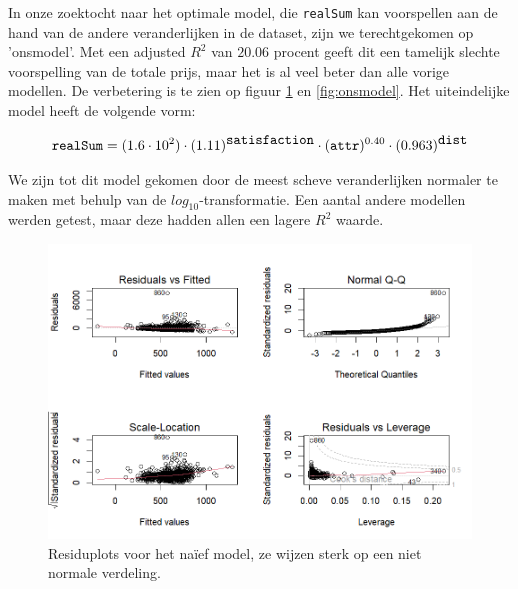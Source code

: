 \documentclass[a4paper]{kulakarticle}
\begin{document}
	In onze zoektocht naar het optimale model, die \verb*|realSum| kan voorspellen aan de hand van de andere veranderlijken in de dataset, zijn we terechtgekomen op 'onsmodel'. Met een adjusted $R^2$ van $20.06$ procent geeft dit een tamelijk slechte voorspelling van de totale prijs, maar het is al veel beter dan alle vorige modellen. De verbetering is te zien op figuur \ref{fig:naiefmodel} en \ref{fig:onsmodel}. Het uiteindelijke model heeft de volgende vorm:
	
	\begin{equation}
		\verb*|realSum| = (1.6 \cdot 10^{2}) \cdot (1.11)^{ \verb*|satisfaction|} \cdot  (\verb*|attr|)^{0.40} \cdot (0.963)^{ \verb*|dist|}
	\end{equation}
	
	We zijn tot dit model gekomen door de meest scheve veranderlijken normaler te maken met behulp van de $log_{10}$-transformatie. Een aantal andere modellen werden getest, maar deze hadden allen een lagere $R^2$ waarde. 
 
	\begin{figure}
		\centering
		\includegraphics[width=0.9\linewidth]{Figuren/naiefmodel}
		\caption{Residuplots voor het naïef model, ze wijzen sterk op een niet normale verdeling.}
		\label{fig:naiefmodel}
	\end{figure}
	
	
	
\end{document}
